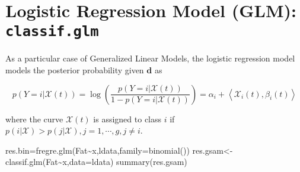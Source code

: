 \documentclass[
]{book}
\newenvironment{Shaded}{\begin{snugshade}}{\end{snugshade}}
\newcommand{\AttributeTok}[1]{\textcolor[rgb]{0.77,0.63,0.00}{#1}}
\newcommand{\DecValTok}[1]{\textcolor[rgb]{0.00,0.00,0.81}{#1}}
\newcommand{\FunctionTok}[1]{\textcolor[rgb]{0.00,0.00,0.00}{#1}}
\newcommand{\NormalTok}[1]{#1}
\newcommand{\OtherTok}[1]{\textcolor[rgb]{0.56,0.35,0.01}{#1}}
\newcommand{\SpecialCharTok}[1]{\textcolor[rgb]{0.00,0.00,0.00}{#1}}
\newcommand{\StringTok}[1]{\textcolor[rgb]{0.31,0.60,0.02}{#1}}
\begin{document}
\begin{Shaded}
\end{Shaded}

\hypertarget{logistic-regression-model-glm-classif.glm}{%
\section{\texorpdfstring{Logistic Regression Model (GLM): \texttt{classif.glm}}{Logistic Regression Model (GLM): classif.glm}}\label{logistic-regression-model-glm-classif.glm}}

As a particular case of Generalized Linear Models, the logistic regression model models the posterior probability given \(\mathbf{d}\) as

\[  p(Y=i|\mathcal{X}(t))=\log \left(\frac{p(Y=i|\mathcal{X}(t))}{1-p(Y=i|\mathcal{X}(t))}\right)=\alpha_i+ \left\langle \mathcal{X}_i(t),\beta_{i}(t)\right\rangle\]

where the curve \(\mathcal{X}(t)\) is assigned to class \(i\) if \(p(i|\mathcal{X})>p(j|\mathcal{X}), j=1,\cdots, g, j\ne i\).

\begin{Shaded}
\begin{Highlighting}[]
\NormalTok{res.bin}\OtherTok{=}\FunctionTok{fregre.glm}\NormalTok{(Fat}\SpecialCharTok{\textasciitilde{}}\NormalTok{x,ldata,}\AttributeTok{family=}\FunctionTok{binomial}\NormalTok{())}
\NormalTok{res.gsam}\OtherTok{\textless{}{-}}\FunctionTok{classif.glm}\NormalTok{(Fat}\SpecialCharTok{\textasciitilde{}}\NormalTok{x,}\AttributeTok{data=}\NormalTok{ldata)}
\FunctionTok{summary}\NormalTok{(res.gsam)}
\end{Highlighting}
\end{Shaded}
\end{document}
